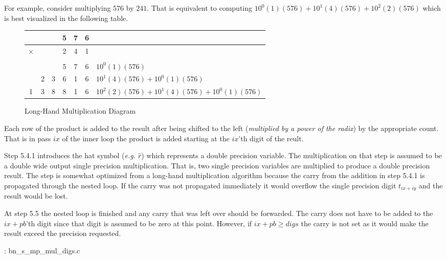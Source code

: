 \documentclass[b5paper]{book}
\begin{document}
For example, consider multiplying $576$ by $241$.  That is equivalent to computing $10^0(1)(576) + 10^1(4)(576) + 10^2(2)(576)$ which is best
visualized in the following table.

\begin{figure}[here]
\begin{center}
\begin{tabular}{|c|c|c|c|c|c|l|}
\hline   &&          & 5 & 7 & 6 & \\
\hline   $\times$&&  & 2 & 4 & 1 & \\
\hline &&&&&&\\
  &&          & 5 & 7 & 6 & $10^0(1)(576)$ \\
  &2 &   3    & 6 & 1 & 6 & $10^1(4)(576) + 10^0(1)(576)$ \\
  1 & 3 & 8 & 8 & 1 & 6 &   $10^2(2)(576) + 10^1(4)(576) + 10^0(1)(576)$ \\
\hline  
\end{tabular}
\end{center}
\caption{Long-Hand Multiplication Diagram}
\end{figure}

Each row of the product is added to the result after being shifted to the left (\textit{multiplied by a power of the radix}) by the appropriate 
count.  That is in pass $ix$ of the inner loop the product is added starting at the $ix$'th digit of the reult.

Step 5.4.1 introduces the hat symbol (\textit{e.g. $\hat r$}) which represents a double precision variable.  The multiplication on that step
is assumed to be a double wide output single precision multiplication.  That is, two single precision variables are multiplied to produce a
double precision result.  The step is somewhat optimized from a long-hand multiplication algorithm because the carry from the addition in step
5.4.1 is propagated through the nested loop.  If the carry was not propagated immediately it would overflow the single precision digit 
$t_{ix+iy}$ and the result would be lost.  

At step 5.5 the nested loop is finished and any carry that was left over should be forwarded.  The carry does not have to be added to the $ix+pb$'th
digit since that digit is assumed to be zero at this point.  However, if $ix + pb \ge digs$ the carry is not set as it would make the result
exceed the precision requested.

\vspace{+3mm}\begin{small}
\hspace{-5.1mm}{\bf File}: bn\_s\_mp\_mul\_digs.c
\vspace{-3mm}
\begin{alltt}
\end{alltt}
\end{small}
\end{document}
